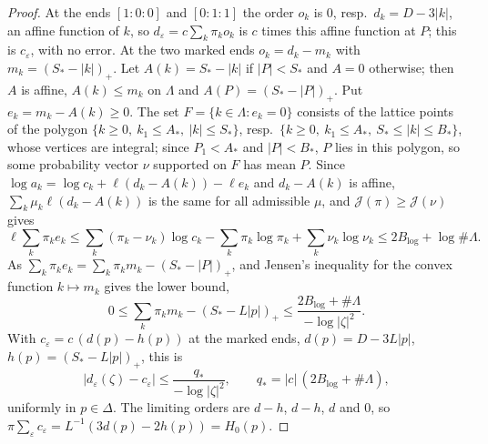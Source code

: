 \begin{proof}
At the ends $[1{:}0{:}0]$ and $[0{:}1{:}1]$ the order $o_k$ is $0$, resp.\ $d_k=D-3|k|$, an affine function of $k$, so
$d_\varepsilon=c\sum_k\pi_ko_k$ is $c$ times this affine function at $P$; this is $c_\varepsilon$, with no error. At the two
marked ends $o_k=d_k-m_k$ with $m_k=(S_*-|k|)_+$. Let $A(k)=S_*-|k|$ if $|P|<S_*$ and $A=0$ otherwise; then $A$ is affine,
$A(k)\le m_k$ on $\Lambda$ and $A(P)=(S_*-|P|)_+$. Put $e_k=m_k-A(k)\ge0$. The set $F=\{k\in\Lambda:e_k=0\}$ consists of the
lattice points of the polygon $\{k\ge0,\ k_1\le A_*,\ |k|\le S_*\}$, resp.\ $\{k\ge0,\ k_1\le A_*,\ S_*\le|k|\le B_*\}$, whose
vertices are integral; since $P_1<A_*$ and $|P|<B_*$, $P$ lies in this polygon, so some probability vector $\nu$ supported on
$F$ has mean $P$. Since $\log a_k=\log c_k+\ell(d_k-A(k))-\ell e_k$ and $d_k-A(k)$ is affine, $\sum_k\mu_k\ell(d_k-A(k))$ is the same
for all admissible $\mu$, and $\mathcal J(\pi)\ge\mathcal J(\nu)$ gives
\[
 \ell\sum_k\pi_ke_k\le\sum_k(\pi_k-\nu_k)\log c_k-\sum_k\pi_k\log\pi_k+\sum_k\nu_k\log\nu_k\le2B_{\log}+\log\#\Lambda .
\]
As $\sum_k\pi_ke_k=\sum_k\pi_km_k-(S_*-|P|)_+$, and Jensen's inequality for the convex function $k\mapsto m_k$ gives the lower bound,
\[
 0\le\sum_k\pi_km_k-(S_*-L|p|)_+\le\frac{2B_{\log}+\#\Lambda}{-\log|\zeta|^2}.
\]
With $c_\varepsilon=c\,(d(p)-h(p))$ at the marked ends, $d(p)=D-3L|p|$, $h(p)=(S_*-L|p|)_+$, this is
\[
 |d_\varepsilon(\zeta)-c_\varepsilon|\le\frac{q_*}{-\log|\zeta|^2},\qquad q_*=|c|\,(2B_{\log}+\#\Lambda),
\]
uniformly in $p\in\Delta$. The limiting orders are $d-h$, $d-h$, $d$ and $0$, so
$\pi\sum_\varepsilon c_\varepsilon=L^{-1}(3d(p)-2h(p))=H_0(p)$.


\end{proof}
